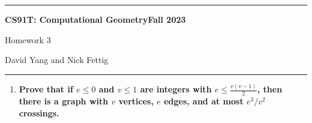 \documentclass[11pt]{article}
\begin{document}
\hrule
\begin{center}
    \textbf{CS91T: Computational Geometry}\hfill \textbf{Fall 2023}\newline

    {\Large Homework 3}

    David Yang and Nick Fettig
\end{center}

\hrule

\vspace{1em}

\begin{enumerate}
    \item\textbf{Prove that if $e\leq0$ and $v\leq1$ are integers with $e\leq \frac{v(v-1)}{2}$, then there is a graph with $v$ vertices, $e$ edges, and at most $e^3/v^2$ crossings.} 






\end{enumerate}
\end{document}
